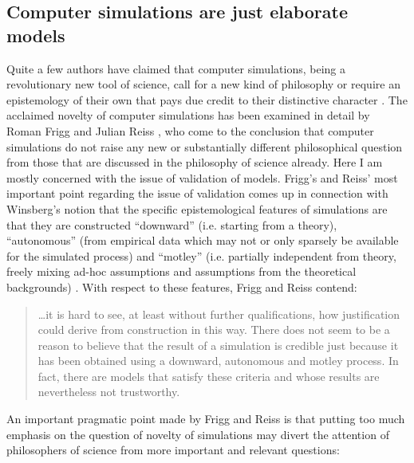\documentclass[onecollarge]{STJour}
\numberwithin{equation}{section}
\begin{document}
\subsection{Computer simulations are just elaborate models}

Quite a few authors have claimed that computer simulations, being a
revolutionary new tool of science, call for a new kind of philosophy or
require an epistemology of their own that pays due credit to their
distinctive character \citep{humphreys:2009, humphreys:2004,
winsberg:2001}. The acclaimed novelty of computer simulations has been
examined in detail by Roman Frigg and Julian Reiss
\citep{frigg-reiss:2009}, who come to the conclusion that computer
simulations do not raise any new or substantially different philosophical
question from those that are discussed in the philosophy of science
already. Here I am mostly concerned with the issue of validation of
models. Frigg's and Reiss' most important point regarding the issue of
validation comes up in connection with Winsberg's notion that the
specific epistemological features of simulations are that they are
constructed ``downward'' (i.e. starting from a theory), ``autonomous''
(from empirical data which may not or only sparsely be available for the
simulated process) and ``motley'' (i.e. partially independent from
theory, freely mixing ad-hoc assumptions and assumptions from the
theoretical backgrounds) \citep[p.\ 447/448]{winsberg:2001}. With respect
to these features, Frigg and Reiss contend:

\begin{quote}

\ldots it is hard to see, at least
without further qualifications, how justification could derive from
construction in this way. There does not seem to be a reason to believe
that the result of a simulation is credible just because it has been
obtained using a downward, autonomous and motley process. In fact, there
are models that satisfy these criteria and whose results are nevertheless
not trustworthy. \citep[p.\ 600]{frigg-reiss:2009}

\end{quote}

An important pragmatic point made by Frigg and Reiss is that putting too
much emphasis on the question of novelty of simulations may divert the
attention of philosophers of science from more important and relevant
questions:
\end{document}
